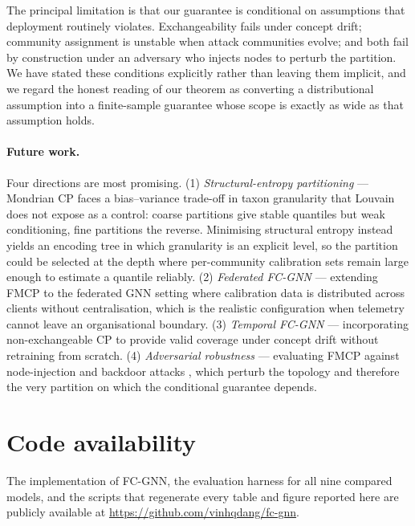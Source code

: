 The principal limitation is that our guarantee is conditional on assumptions
that deployment routinely violates. Exchangeability fails under concept drift;
community assignment is unstable when attack communities evolve; and both fail
by construction under an adversary who injects nodes to perturb the partition.
We have stated these conditions explicitly rather than leaving them implicit,
and we regard the honest reading of our theorem as converting a distributional
assumption into a finite-sample guarantee whose scope is exactly as wide as that
assumption holds.

\paragraph{Future work.}
Four directions are most promising.
(1) \emph{Structural-entropy partitioning} — Mondrian CP faces a
bias--variance trade-off in taxon granularity that Louvain does not expose as a
control: coarse partitions give stable quantiles but weak conditioning, fine
partitions the reverse. Minimising structural entropy \citep{zeng2025structural}
instead yields an encoding tree in which granularity is an explicit level, so
the partition could be selected at the depth where per-community calibration
sets remain large enough to estimate a quantile reliably.
(2) \emph{Federated FC-GNN} — extending FMCP to the federated GNN setting
\citep{akgul25,dang24federated} where calibration data is distributed
across clients without centralisation, which is the realistic configuration when
telemetry cannot leave an organisational boundary.
(3) \emph{Temporal FC-GNN} — incorporating non-exchangeable CP
\citep{ncpnet25} to provide valid coverage under concept drift without
retraining from scratch.
(4) \emph{Adversarial robustness} — evaluating FMCP against node-injection and
backdoor attacks \citep{gzoo2024, dshield2023}, which perturb the topology and
therefore the very partition on which the conditional guarantee depends.

\section*{Code availability}
The implementation of FC-GNN, the evaluation harness for all nine compared
models, and the scripts that regenerate every table and figure reported here are
publicly available at \url{https://github.com/vinhqdang/fc-gnn}.
